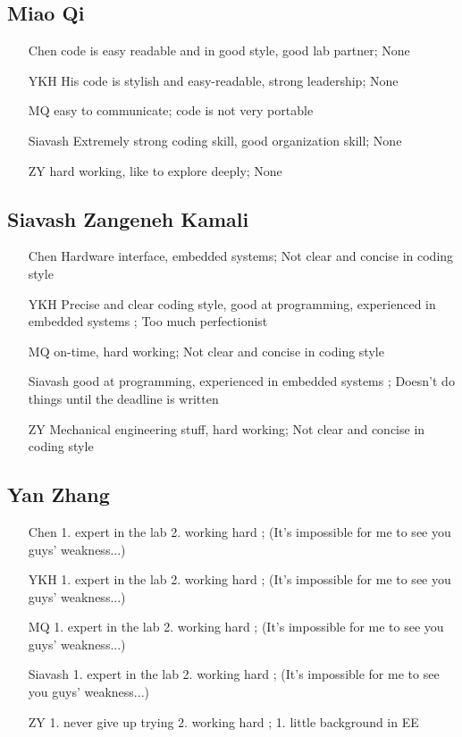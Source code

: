 \documentclass[a4paper]{article}
\begin{document}
\subsection{Miao Qi}
\begin{itemize}
\item[Chen]	code is easy readable and in good style, good lab partner; None
\item[YKH]	His code is stylish and easy-readable, strong leadership; None
\item[MQ]	easy to communicate; code is not very portable
\item[Siavash]	Extremely strong coding skill, good organization skill; None
\item[ZY]	hard working, like to explore deeply; None
\end{itemize}

\subsection{Siavash Zangeneh Kamali}
\begin{itemize}
\item[Chen] Hardware interface, embedded systems; Not clear and concise in coding style
\item[YKH] Precise and clear coding style, good at programming, experienced in embedded systems ; Too much perfectionist
\item[MQ] on-time, hard working; Not clear and concise in coding style
\item[Siavash] good at programming, experienced in embedded systems ; Doesn't do things until the deadline is written
\item[ZY] Mechanical engineering stuff, hard working; Not clear and concise in coding style
\end{itemize}

\subsection{Yan Zhang}
\begin{itemize}
\item[Chen] 1. expert in the lab 2. working hard	;	(It's impossible for me to see you guys' weakness...)
\item[YKH]	1. expert in the lab 2. working hard	;	(It's impossible for me to see you guys' weakness...)
\item[MQ]	1. expert in the lab 2. working hard	;	(It's impossible for me to see you guys' weakness...)
\item[Siavash]	1. expert in the lab 2. working hard	;	(It's impossible for me to see you guys' weakness...)
\item[ZY]	1. never give up trying 2. working hard	;	1. little background in EE
\end{itemize}
\end{document}
